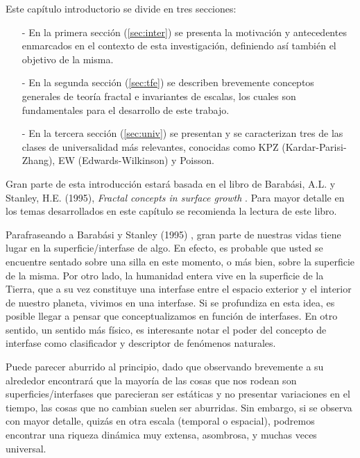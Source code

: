 \graphicspath{{figs/cap2}}

Este capítulo introductorio se divide en tres secciones: 

\begin{itemize}
    \item[-] En la primera sección (\ref{sec:inter}) se presenta la motivación y antecedentes enmarcados en el contexto de esta investigación, definiendo 
    así también el objetivo de la misma.
    \item[-] En la segunda sección (\ref{sec:tfe}) se describen brevemente conceptos generales de teoría fractal e invariantes de escalas, los cuales son
    fundamentales para el desarrollo de este trabajo.
    \item[-] En la tercera sección (\ref{sec:univ}) se presentan y se caracterizan tres de las clases de universalidad más relevantes, conocidas como 
    KPZ (Kardar-Parisi-Zhang), EW (Edwards-Wilkinson) y Poisson.
\end{itemize}

Gran parte de esta introducción estará basada en el libro de 
Barabási, A.L. y Stanley, H.E. (1995), \textit{Fractal concepts in surface growth} \cite{barabasi}. Para mayor detalle en los temas desarrollados en este capítulo
se recomienda la lectura de este libro.


Parafraseando a Barabási y Stanley (1995) \cite{barabasi}, gran parte de nuestras vidas tiene lugar en la superficie/interfase de algo. En efecto, es probable que usted se 
encuentre sentado sobre una silla en este momento, o más bien, sobre la superficie de la misma. Por otro lado, la humanidad entera vive en la superficie de la Tierra, que 
a su vez constituye una interfase entre el espacio exterior y el interior de nuestro planeta, vivimos en una interfase. Si se profundiza en esta idea, es posible 
llegar a pensar que conceptualizamos en función de interfases. En otro sentido, un sentido más físico, es interesante notar el poder del concepto de interfase como 
clasificador y descriptor de fenómenos naturales. 

Puede parecer aburrido al principio, dado que observando brevemente a su alrededor encontrará que la mayoría de las cosas que nos rodean son superficies/interfases que 
parecieran ser estáticas y no presentar variaciones en el tiempo, las cosas que no cambian suelen ser aburridas. Sin embargo, si se observa 
con mayor detalle, quizás en otra escala (temporal o espacial), podremos encontrar una riqueza dinámica muy extensa, asombrosa, y muchas veces universal.

